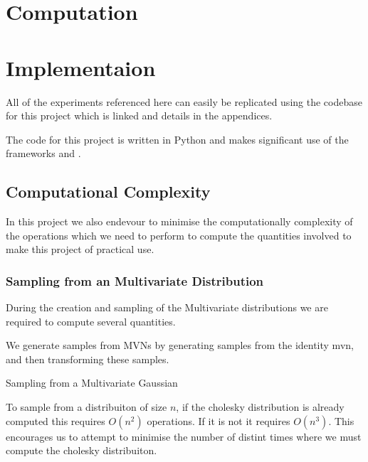 \documentclass[12pt, a4paper]{report}
\theoremstyle{definition}
\begin{document}
\chapter{Computation}
\label{sec:Computation}


\chapter{Implementaion}
\label{sec:Implementaion}

All of the experiments referenced here can easily be replicated using the codebase for this project which is linked and details in the appendices.

The code for this project is written in Python and makes significant use of the frameworks \cite[Pytorch]{NEURIPS2019_9015} and \cite[GPytorch]{gardner2018gpytorch}.





\section{Computational Complexity}

In this project we also endevour to minimise the computationally complexity of the operations which we need to perform to compute the quantities involved to make this project of practical use.


\subsection{Sampling from an Multivariate Distribution}


During the creation and sampling of the Multivariate distributions we are required to compute several quantities.

We generate samples from MVNs by generating samples from the identity mvn, and then transforming these samples.

\begin{algorithm}[H]
    \SetAlgoLined
    \caption{Sampling from a Multivariate Gaussian}
\end{algorithm}

To sample from a distribuiton of size $n$, if the cholesky distribution is already computed this requires $O(n^2)$ operations. If it is not it requires $O(n^3)$. This encourages us to attempt to minimise the number of distint times where we must compute the cholesky distribuiton.
\end{document}
